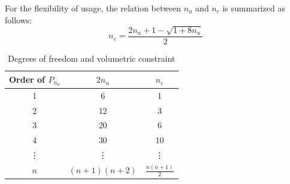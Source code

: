 For the flexibility of usage, the relation between $n_u$ and $n_c$ is summarized as follows:
\begin{equation}
    n_c = \frac{2n_u+1 - \sqrt{1+8n_u}}{2}
\end{equation}
\begin{table}[ht!]
\centering
\caption{Degrees of freedom and volumetric constraint}
\label{tab:constraint}
\begin{tabular}{ccc}
\toprule
    Order of $P_{n_u}$ & $2n_u$ & $n_c$ \\
\midrule
1 & 6 & 1 \\
2 & 12 & 3 \\
3 & 20 & 6 \\
4 & 30 & 10 \\
\vdots & \vdots & \vdots \\
$n$ & $(n+1)(n+2)$ & $\frac{n(n+1)}{2}$ \\
\bottomrule
\end{tabular}
\end{table}

